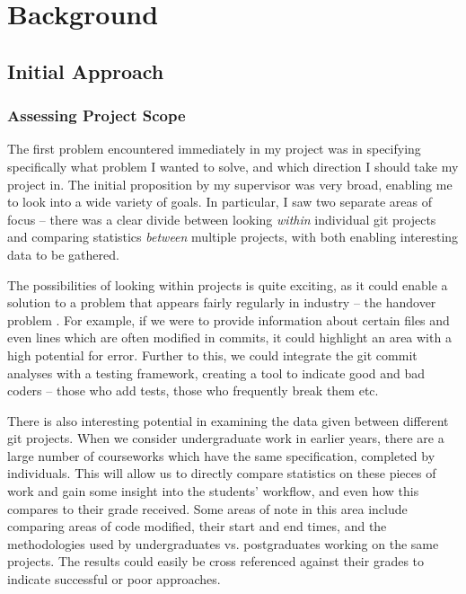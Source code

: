\chapter{Background}

\label{Background}



\section{Initial Approach}

\subsection{Assessing Project Scope}
The first problem encountered immediately in my project was in specifying
specifically what problem I wanted to solve, and which direction I should take
my project in. The initial proposition by my supervisor was very broad, 
enabling me to look into a wide variety of goals. In particular, I saw two separate areas
of focus -- there was a clear divide between looking \emph{within} individual git 
projects and comparing statistics \emph{between} multiple projects, with both 
enabling interesting data to be gathered. 

The possibilities of looking within projects is quite exciting, as it could enable a solution
to a problem that appears fairly regularly in industry -- the handover problem \cite{handover}.
For example, if we were to provide information about certain files and even lines which are 
often modified in commits, it could highlight an area with a high potential for error.
Further to this, we could integrate the git commit analyses with a testing
framework, creating a tool to indicate good and bad coders -- those who add
tests, those who frequently break them etc.

There is also interesting potential in examining the data given between different
git projects. When we consider undergraduate work in earlier years, there are a
large number of courseworks which have the same specification, completed by 
individuals. This will allow us to directly compare statistics on these pieces
of work and gain some insight into the students' workflow, and even how this
compares to their grade received. Some areas of note in this area include comparing
areas of code modified, their start and end times, and the methodologies used
by undergraduates vs. postgraduates working on the same projects. The results
could easily be cross referenced against their grades to indicate successful
or poor approaches.

